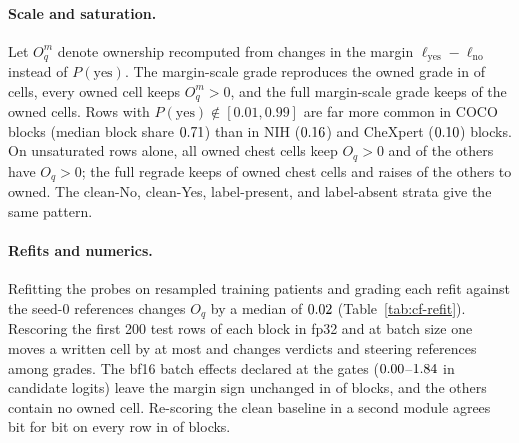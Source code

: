 \documentclass{article}
\begin{document}
\paragraph{Scale and saturation.} Let $O^m_q$ denote ownership recomputed from changes in the margin $\ell_{\mathrm{yes}}-\ell_{\mathrm{no}}$ instead of $P(\mathrm{yes})$. The margin-scale grade reproduces the owned grade in \cfScaleAgree{} of \cfScaleAgreeN{} cells, every owned cell keeps $O^m_q>0$, and the full margin-scale grade keeps \cfScaleOwnedKeepFull{} of the \cfScaleOwned{} owned cells. Rows with $P(\mathrm{yes})\notin[0.01,0.99]$ are far more common in COCO blocks (median block share $0.71$) than in NIH ($0.16$) and CheXpert ($0.10$) blocks. On unsaturated rows alone, all \cfScaleUnsatOwned{} owned chest cells keep $O_q>0$ and \cfScaleUnsatOtherPos{} of the \cfScaleUnsatOther{} others have $O_q>0$; the full regrade keeps \cfScaleUnsatGradeKept{} of \cfScaleUnsatGradeN{} owned chest cells and raises \cfScaleUnsatGradeGained{} of the \cfScaleUnsatGradeOtherN{} others to owned. The clean-No, clean-Yes, label-present, and label-absent strata give the same pattern.

\paragraph{Refits and numerics.} Refitting the probes on resampled training patients and grading each refit against the seed-0 references changes $O_q$ by a median of $0.02$ (Table~\ref{tab:cf-refit}). Rescoring the first 200 test rows of each block in fp32 and at batch size one moves a written cell by at most \cfPrecisionMaxDW{} and changes \cfPrecisionVerdictChanges{} verdicts and \cfPrecisionRefChanges{} steering references among \cfPrecisionGradeCells{} grades. The bf16 batch effects declared at the gates ($0.00$--$1.84$ in candidate logits) leave the margin sign unchanged in \cfScaleBatchAgree{} of \cfScaleBatchN{} blocks, and the \cfScaleBatchDisagree{} others contain no owned cell. Re-scoring the clean baseline in a second module agrees bit for bit on every row in \cfScaleBaselineIdentical{} of \cfScaleBaselineN{} blocks.
\end{document}
